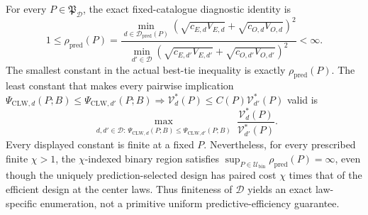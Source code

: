 For every \(P\in\mathfrak P_{\mathcal D}\), the exact fixed-catalogue diagnostic identity is
\[
 1\le\rho_{\mathrm{pred}}(P)
 =\frac{\min_{d\in\mathcal D_{\mathrm{pred}}(P)}
 (\sqrt{c_{E,d}V_{E,d}}+\sqrt{c_{O,d}V_{O,d}})^2}
 {\min_{d'\in\mathcal D}
 (\sqrt{c_{E,d'}V_{E,d'}}+\sqrt{c_{O,d'}V_{O,d'}})^2}<\infty.
\]
The smallest constant in the actual best-tie inequality is exactly \(\rho_{\mathrm{pred}}(P)\). The least constant that makes every pairwise implication
\(\Psi_{\mathrm{CLW},d}(P;B)\le\Psi_{\mathrm{CLW},d'}(P;B)\Rightarrow \mathcal V_d^*(P)\le C(P)\mathcal V_{d'}^*(P)\)
valid is
\[
 \max_{\substack{d,d'\in\mathcal D:\,
 \Psi_{\mathrm{CLW},d}(P;B)\le\Psi_{\mathrm{CLW},d'}(P;B)}}
 \frac{\mathcal V_d^*(P)}{\mathcal V_{d'}^*(P)}.
\]
Every displayed constant is finite at a fixed \(P\). Nevertheless, for every prescribed finite \(\chi>1\), the \(\chi\)-indexed binary region satisfies \(\sup_{P\in\mathcal U_{\mathrm{bin}}}\rho_{\mathrm{pred}}(P)=\infty\), even though the uniquely prediction-selected design has paired cost \(\chi\) times that of the efficient design at the center laws. Thus finiteness of \(\mathcal D\) yields an exact law-specific enumeration, not a primitive uniform predictive-efficiency guarantee.